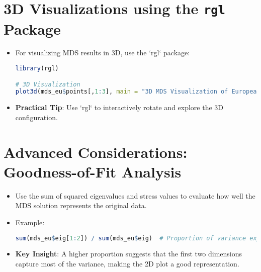 \section{3D Visualizations using the \texttt{rgl} Package}
\begin{itemize}
    \item For visualizing MDS results in 3D, use the `rgl` package:
\begin{lstlisting}[language=R, breaklines=true]
library(rgl)

# 3D Visualization
plot3d(mds_eu$points[,1:3], main = "3D MDS Visualization of European Cities")
\end{lstlisting}
\item \textbf{Practical Tip}: Use `rgl` to interactively rotate and explore the 3D configuration.
\end{itemize}

\section{Advanced Considerations: Goodness-of-Fit Analysis}
\begin{itemize}
    \item Use the sum of squared eigenvalues and stress values to evaluate how well the MDS solution represents the original data.
    \item Example:
\begin{lstlisting}[language=R, breaklines=true]
sum(mds_eu$eig[1:2]) / sum(mds_eu$eig)  # Proportion of variance explained by first 2 dimensions
\end{lstlisting}
\item \textbf{Key Insight}: A higher proportion suggests that the first two dimensions capture most of the variance, making the 2D plot a good representation.
\end{itemize}

